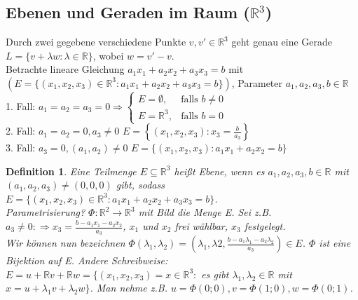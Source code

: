 \documentclass[12pt,a4paper]{article}
\theoremstyle{plain}
\newtheorem{Definition}[Theorem]{Definition}
\newcommand{\R}{\mathbb{R}}
\numberwithin{equation}{section}
\begin{document}
\subsection{Ebenen und Geraden im Raum ($\R^3$)}
Durch zwei gegebene verschiedene Punkte $v,v'\in\R^3$ geht genau eine Gerade $L=\{v+\lambda w: \lambda\in \R\}$, wobei $w=v'-v$.\\
Betrachte lineare Gleichung $a_1x_1+a_2x_2+a_3x_3=b$ mit $(E=\{(x_1,x_2,x_3)\in\R^3: a_1x_1+a_2x_2+a_3x_3=b\})$, Parameter $a_1,a_2,a_3,b\in\R$\\
1. Fall: $a_1=a_2=a_3=0\Rightarrow \left\lbrace\begin{array}{ll}E=\emptyset,&\text{falls }b\neq 0 \\ E=\R^3,&\text{falls }b=0 \end{array}\right.$\\
2. Fall: $a_1=a_2=0,a_3\neq 0$ $E=\left\lbrace(x_1,x_2,x_3):x_3=\frac{b}{a_3}\right\rbrace$\\
3. Fall: $a_3=0,(a_1,a_2)\neq 0$ $E=\{(x_1,x_2,x_3):a_1 x_1+a_2 x_2=b\}$
\begin{Definition}
Eine Teilmenge $E\subseteq \R^3$ heißt Ebene, wenn es $a_1,a_2,a_3,b\in\R$ mit $(a_1,a_2,a_3)\neq (0,0,0)$ gibt, sodass $E=\{(x_1,x_2,x_3)\in\R^3:a_1x_1+a_2x_2+a_3x_3=b\}$.\\
Parametrisierung? $\Phi:\R^2\rightarrow \R^3$ mit Bild die Menge E. Sei z.B. $a_3\neq 0: \Rightarrow x_3=\frac{b-a_1x_1-a_2x_2}{a_3}$, $x_1$ und $x_2$ frei wählbar, $x_3$ festgelegt. \\
Wir können nun bezeichnen $\Phi(\lambda_1,\lambda_2)=\left(\lambda_1,\lambda2,\frac{b-a_1\lambda_1-a_2\lambda_2}{a_3}\right)\in E$. $\Phi$ ist eine Bijektion auf E. Andere Schreibweise: $E=u+\R v+\R w=\{(x_1,x_2,x_3)=x\in\R^3:$ es gibt $\lambda_1,\lambda_2\in \R$ mit $x=u+\lambda_1 v+\lambda_2 w\}$. Man nehme z.B. $u=\Phi(0;0),v=\Phi(1;0),w=\Phi(0;1)$.
\end{Definition}
\end{document}
